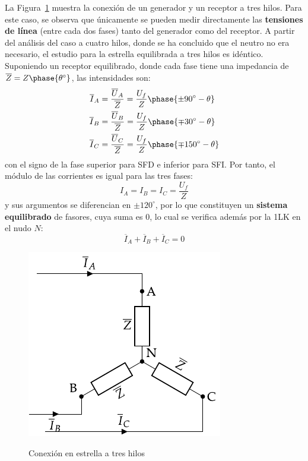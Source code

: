 	
	
	La Figura~\ref{fig.conexion_estrella_3} muestra la conexión de un generador y un receptor a tres hilos. Para este caso, se observa que únicamente se pueden medir directamente las \textbf{tensiones de línea} (entre cada dos fases) tanto del generador como del receptor. A partir del análisis del caso a cuatro hilos, donde se ha concluido que el neutro no era necesario, el estudio para la estrella equilibrada a tres hilos es idéntico. Suponiendo un receptor equilibrado, donde cada fase tiene una impedancia de $\overline{Z}=Z\phase{\theta^\circ}$, las intensidades son:
	\begin{align*}
      \overline{I}_A &= \frac{\overline{U}_A}{\overline{Z}} = \frac{U_f}{Z}\phase{{\pm 90^\circ} - \theta} \\
      \overline{I}_B &= \frac{\overline{U}_B}{\overline{Z}} = \frac{U_f}{Z}\phase{{\mp 30^\circ} - \theta}\\
      \overline{I}_C &= \frac{\overline{U}_C}{\overline{Z}} = \frac{U_f}{Z}\phase{{\mp 150^\circ} - \theta}
    \end{align*}
    con el signo de la fase superior para SFD e inferior para SFI. Por tanto, el módulo de las corrientes es igual para las tres fases: 
    \begin{equation}
        \boxed{I_A = I_B = I_C = \dfrac{U_f}{Z}}
    \end{equation}
    y sus argumentos se diferencian en $\pm120^\circ$, por lo que constituyen un \textbf{sistema equilibrado} de fasores, cuya suma es 0, lo cual se verifica además por la 1LK en el nudo $N$: 
    \begin{equation*}
        \overline{I}_A  + \overline{I}_B + \overline{I}_C = 0
    \end{equation*}
	\begin{figure}[H]
		\centering
		{\includegraphics{../figs/EstrellaEquilibrado_Receptor_SN.pdf}}
		\caption{Conexión en estrella a tres hilos}
		\label{fig.conexion_estrella_3}
	\end{figure}

